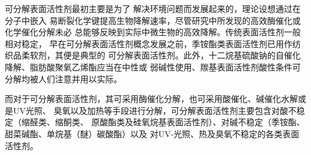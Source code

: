 \documentclass[bachelor,fandolfonts,replaceperiod]{jnuthesis} %
\begin{document}
 可分解表面活性剂最初主要是为了
    解决环境问题而发展起来的，理论设想通过在分子中嵌入
    易断裂化学键提高生物降解速率，尽管研究中所发现的高效酶催化或化学催化分解未必
    总能够反映到实际中微生物的高效降解\cite{tehrani2007}。传统表面活性剂一般相对稳定，
    早在可分解表面活性剂概念发展之前，季铵酯类表面活性剂已用作纺织品柔软剂，其便是典型的
    可分解表面活性剂。此外，十二烷基硫酸钠的自催化降解、脂肪酸聚氧乙烯酯应当在中性或
    弱碱性使用、羰基表面活性剂酸性条件可分解均被人们注意并用以实际\cite{tehrani2007}。
    
    而对于可分解表面活性剂，其可采用酶催化分解，也可采用酸催化、碱催化水解或是UV光照、
    臭氧以及加热等手段进行分解，可分解表面活性剂主要包含对酸不稳定（缩醛类、缩酮类、
    原酸酯类及硅氧烷基表面活性剂）、对碱不稳定（季铵酯、甜菜碱酯、单烷基（醚）碳酸酯）以及
    对UV-光照、热及臭氧不稳定的各类表面活性剂\cite{hellberg2000,tehrani2007,shukla2010,narayanan2008}。%
    
    
\end{document}
